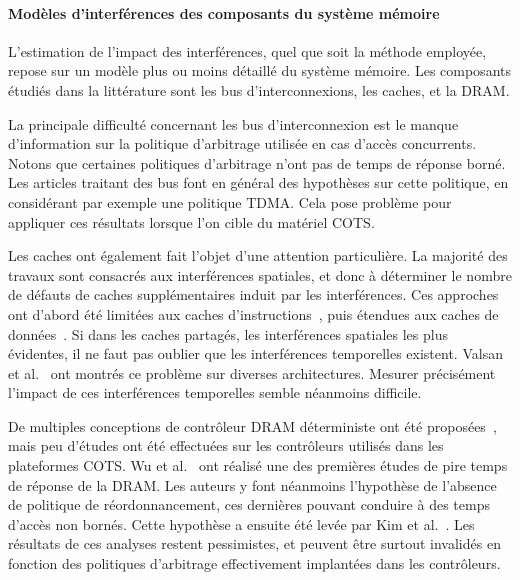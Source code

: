 \paragraph{Modèles d'interférences des composants du système mémoire}
L'estimation de l'impact des interférences, quel que soit la méthode employée, repose sur un modèle plus ou moins détaillé du système mémoire.
Les composants étudiés dans la littérature sont les bus d'interconnexions, les caches, et la DRAM.

La principale difficulté concernant les bus d'interconnexion est le manque d'information sur la politique d'arbitrage utilisée en cas d'accès concurrents.
Notons que certaines politiques d'arbitrage n'ont pas de temps de réponse borné.
Les articles traitant des bus font en général des hypothèses sur cette politique, en considérant par exemple une politique TDMA.
Cela pose problème pour appliquer ces résultats lorsque l'on cible du matériel COTS.

Les caches ont également fait l'objet d'une attention particulière.
La majorité des travaux sont consacrés aux interférences spatiales, et donc à déterminer le nombre de défauts de caches supplémentaires induit par les interférences.
Ces approches ont d'abord été limitées aux caches d'instructions~\cite{2008_Yan_WCET_analysis_for_Multi_Core_processors_with_shared_L2_instruction_caches,zhang2009accurately,2009_hardy_using_bypass_to_tighten_WCET_estimates_for_Multi_Core_processors_with_shared_instruction_caches}, puis étendues aux caches de données~\cite{2010_Lesage_shared_data_caches_conflicts_reduction_for_WCET_computation_in_Multi_Core_architectures}.
Si dans les caches partagés, les interférences spatiales les plus évidentes, il ne faut pas oublier que les interférences temporelles existent.
Valsan et al.~\cite{valsan2016taming} ont montrés ce problème sur diverses architectures.
Mesurer précisément l'impact de ces interférences temporelles semble néanmoins difficile.

De multiples conceptions de contrôleur DRAM déterministe ont été proposées~\cite{2007_Akesson_Predator_A_predictable_SDRAM_memory_controller,2011_Reineke_PRET_DRAM_controller_bank_privatization_for_predictability_and_temporal_isolation,2014_Krishnapillai_ROC_A_rank_switching_open_row_DRAM_controller_for_time_predictable_systems}, mais peu d'études ont été effectuées sur les contrôleurs utilisés dans les plateformes COTS.
Wu et al.~\cite{wu2013worst} ont réalisé une des premières études de pire temps de réponse de la DRAM.
Les auteurs y font néanmoins l'hypothèse de l'absence de politique de réordonnancement, ces dernières pouvant conduire à des temps d'accès non bornés.
Cette hypothèse a ensuite été levée par Kim et al.~\cite{kim2014bounding,kim2016bounding}.
Les résultats de ces analyses restent pessimistes, et peuvent être surtout invalidés en fonction des politiques d'arbitrage effectivement implantées dans les contrôleurs.

